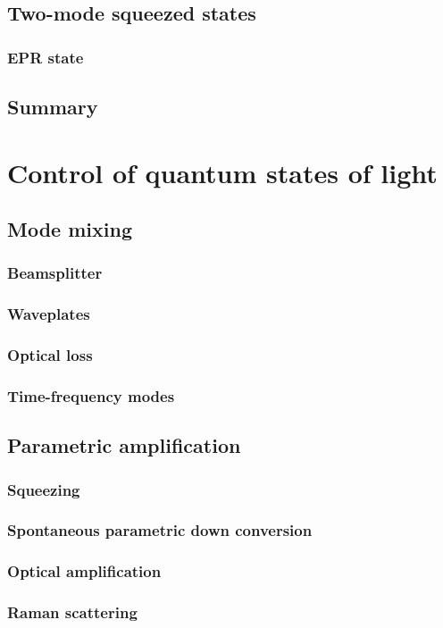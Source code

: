 \documentclass{book}
\begin{document}
\section{Two-mode squeezed states}
\subsection{EPR state}
\section{Summary}

\chapter{Control of quantum states of light}
\section{Mode mixing}
\subsection{Beamsplitter}
\subsection{Waveplates}
\subsection{Optical loss}
\subsection{Time-frequency modes}
\section{Parametric amplification}
\subsection{Squeezing}
\subsection{Spontaneous parametric down conversion}
\subsection{Optical amplification}
\subsection{Raman scattering}
\end{document}
